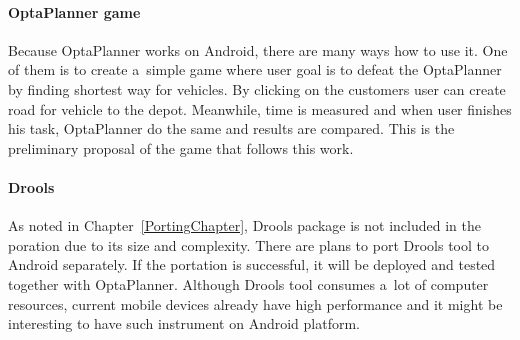 \paragraph{OptaPlanner game}
Because OptaPlanner works on Android, there are many ways how to use it. One of them is to create a~simple game where
user goal is to defeat the OptaPlanner by finding shortest way for vehicles. By clicking on the customers user can
create road for vehicle to the depot. Meanwhile, time is measured and when user finishes his task, OptaPlanner do the
same and results are compared. This is the preliminary proposal of the game that follows this work.

\paragraph{Drools}
As noted in Chapter~\ref{PortingChapter}, Drools package is not included in the poration due to its size and complexity.
There are plans to port Drools tool to Android separately. If the portation is successful, it will be deployed and
tested together with OptaPlanner. Although Drools tool consumes a~lot of computer resources, current mobile devices
already have high performance and it might be interesting to have such instrument on Android platform.
